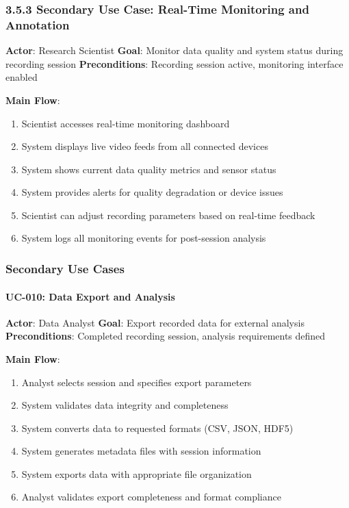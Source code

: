 \documentclass[12pt,a4paper]{article}
\begin{document}
\subsubsection{3.5.3 Secondary Use Case: Real-Time Monitoring and Annotation}

\textbf{Actor}: Research Scientist  
\textbf{Goal}: Monitor data quality and system status during recording session  
\textbf{Preconditions}: Recording session active, monitoring interface enabled

\textbf{Main Flow}:

\begin{enumerate}
\item Scientist accesses real-time monitoring dashboard
\item System displays live video feeds from all connected devices
\item System shows current data quality metrics and sensor status
\item System provides alerts for quality degradation or device issues
\item Scientist can adjust recording parameters based on real-time feedback
\item System logs all monitoring events for post-session analysis

\end{enumerate}
\subsubsection{Secondary Use Cases}

\paragraph{UC-010: Data Export and Analysis}

\textbf{Actor}: Data Analyst  
\textbf{Goal}: Export recorded data for external analysis  
\textbf{Preconditions}: Completed recording session, analysis requirements defined

\textbf{Main Flow}:

\begin{enumerate}
\item Analyst selects session and specifies export parameters
\item System validates data integrity and completeness
\item System converts data to requested formats (CSV, JSON, HDF5)
\item System generates metadata files with session information
\item System exports data with appropriate file organization
\item Analyst validates export completeness and format compliance

\end{enumerate}
\end{document}
